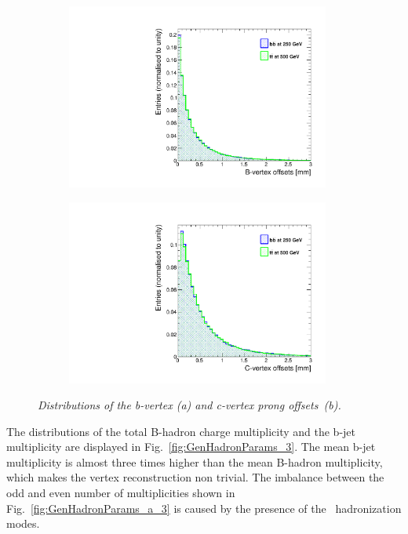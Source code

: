 \begin{figure}
\centering
\begin{subfigure}{0.5\textwidth}
    \includegraphics[width=0.95\textwidth]{ILD/plots/gen-bvtx-offsets.pdf}
\caption{\label{fig:GenVtxOffset_a_3} }
\end{subfigure}%
  \begin{subfigure}{0.5\textwidth}
\centering
    \includegraphics[width=0.95\textwidth]{ILD/plots/gen-cvtx-offsets.pdf}
\caption{\label{fig:GenVtxOffset_b_3} }
\end{subfigure}
    \caption{\sl Distributions of the b-vertex (a) and c-vertex prong offsets~(b). }
    \label{fig:GenVtxOffset_3}
\end{figure}

The distributions of the total B-hadron charge multiplicity and the b-jet multiplicity are displayed in Fig.~\ref{fig:GenHadronParams_3}. The mean b-jet multiplicity is almost three times higher than the mean B-hadron multiplicity, which makes the vertex reconstruction non trivial. 
The imbalance between the odd and even number of multiplicities shown in Fig.~\ref{fig:GenHadronParams_a_3} is caused by the presence of the \Bzs\ hadronization modes.

